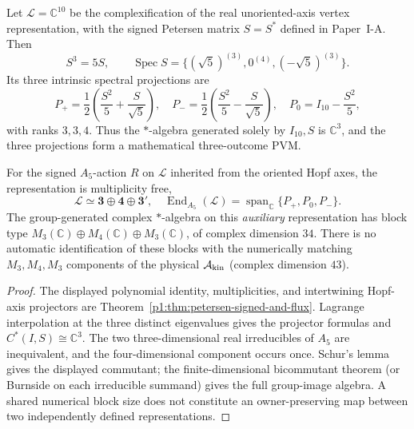\documentclass[12pt,a4paper]{article}
\begin{document}
\begin{theorem}
\label{p4a:thm:v320-signed-projective-test}
Let $\mathcal L=\mathbb C^{10}$ be the complexification of the real
unoriented-axis vertex representation, with the signed Petersen matrix
$S=S^*$ defined in Paper~I-A. Then
\[
 S^3=5S,\qquad
 \operatorname{Spec}S=\{(\sqrt5)^{(3)},0^{(4)},(-\sqrt5)^{(3)}\}.
\]
Its three intrinsic spectral projections are
\[
 P_+=\frac12\left(\frac{S^2}{5}+\frac{S}{\sqrt5}\right),\quad
 P_-=\frac12\left(\frac{S^2}{5}-\frac{S}{\sqrt5}\right),\quad
 P_0=I_{10}-\frac{S^2}{5},
\]
with ranks $3,3,4$. Thus the $*$-algebra generated solely by
$I_{10},S$ is $\mathbb C^3$, and the three projections form a
mathematical three-outcome PVM.

For the signed $A_5$-action $R$ on $\mathcal L$ inherited from the
oriented Hopf axes, the representation is multiplicity free,
\[
 \mathcal L\simeq\mathbf3\oplus\mathbf4\oplus\mathbf3',
 \quad \operatorname{End}_{A_5}(\mathcal L)
 =\operatorname{span}_{\mathbb C}\{P_+,P_0,P_-\}.
\]
The group-generated complex $*$-algebra on this \emph{auxiliary}
representation has block type
$M_3(\mathbb C)\oplus M_4(\mathbb C)\oplus M_3(\mathbb C)$,
of complex dimension $34$.
There is no automatic identification of these blocks with the
numerically matching $M_3,M_4,M_3$ components of the physical
$\mathcal A_{\rm kin}$ (complex dimension $43$).
\end{theorem}
\begin{proof}
The displayed polynomial identity, multiplicities, and intertwining
Hopf-axis projectors are Theorem~\ref{p1:thm:petersen-signed-and-flux}.
Lagrange interpolation at the three distinct eigenvalues gives the
projector formulas and $C^*(I,S)\cong\mathbb C^3$.
The two three-dimensional real irreducibles of $A_5$ are inequivalent,
and the four-dimensional component occurs once. Schur's lemma gives
the displayed commutant; the finite-dimensional bicommutant theorem
(or Burnside on each irreducible summand) gives the full group-image
algebra. A shared numerical block size does not constitute an
owner-preserving map between two independently defined representations.
\end{proof}
\end{document}

